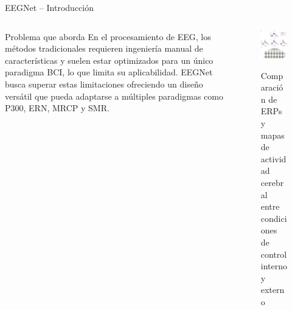 \documentclass{beamer}
\begin{document}
\begin{frame}{EEGNet – Introducción}
\begin{columns}[T] %
    \begin{column}{0.55\textwidth}
        \begin{block}{Problema que aborda}
En el procesamiento de EEG, los métodos tradicionales requieren ingeniería manual de características y suelen estar optimizados para un único paradigma BCI, lo que limita su aplicabilidad. EEGNet busca superar estas limitaciones ofreciendo un diseño versátil que pueda adaptarse a múltiples paradigmas como P300, ERN, MRCP y SMR.
        \end{block}
    \end{column}

    \begin{column}{0.4\textwidth}
        \begin{figure}
            \centering
            \href{https://www.nature.com/articles/s41598-018-31673-2/figures/2}{%
                \includegraphics[width=\linewidth]{EEGpatterns.png}%
            }
            \caption{\small Comparación de ERPs y mapas de actividad cerebral entre condiciones de control interno y externo}
            \label{fig:flujo_eeg}
        \end{figure}
    \end{column}
\end{columns}
\end{frame}
\end{document}
